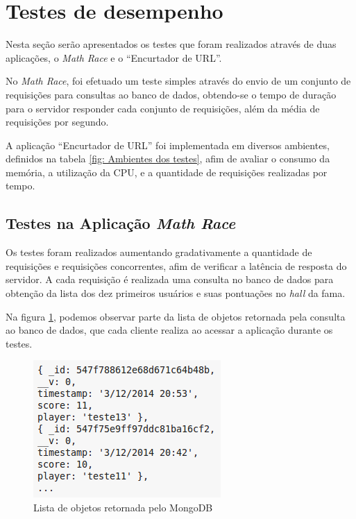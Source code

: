 \section{Testes de desempenho}
\label{subsec: Testes de desempenho}
Nesta seção serão apresentados os testes que foram realizados através de duas aplicações, o \textit{Math Race} e o ``Encurtador de URL''. 

No \textit{Math Race}, foi efetuado um teste simples através do envio de um conjunto de requisições para consultas ao banco de dados, obtendo-se o tempo de duração para o servidor responder cada conjunto de requisições, além da média de requisições por segundo.

A aplicação ``Encurtador de URL'' foi implementada em diversos ambientes, definidos na tabela \ref{fig: Ambientes dos testes}, afim de avaliar o consumo da memória, a utilização da CPU, e a quantidade de requisições realizadas por tempo. 

\subsection{Testes na Aplicação \textit{Math Race}}
Os testes foram realizados aumentando gradativamente a quantidade de requisições e requisições concorrentes, afim de verificar a latência de resposta do servidor. A cada requisição é realizada uma consulta no banco de dados para obtenção da lista dos dez primeiros usuários e suas pontuações no \textit{hall} da fama.

Na figura \ref{fig: Lista de objetos retornada pelo MongoDB}, podemos observar parte da lista de objetos retornada pela consulta ao banco de dados, que cada cliente realiza ao acessar a aplicação durante os testes.

    \begin{figure}[htb]
    \centering
    \includegraphics[scale=0.7]{images/objs_hof_bd.png}
    \caption{Lista de objetos retornada pelo MongoDB}
    \label{fig: Lista de objetos retornada pelo MongoDB}
    \end{figure}

